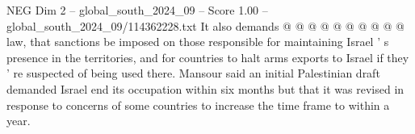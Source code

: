 \begin{textsample}{NEG Dim 2 – global\_south\_2024\_09 – Score 1.00 – global\_south\_2024\_09/114362228.txt}
It also demands @ @ @ @ @ @ @ @ @ @ law, that sanctions be imposed on those responsible for maintaining Israel ' s presence in the territories, and for countries to halt arms exports to Israel if they ' re suspected of being used there.
Mansour said an initial Palestinian draft demanded Israel end its occupation within six months but that it was revised in response to concerns of some countries to increase the time frame to within a year.

\end{textsample}

